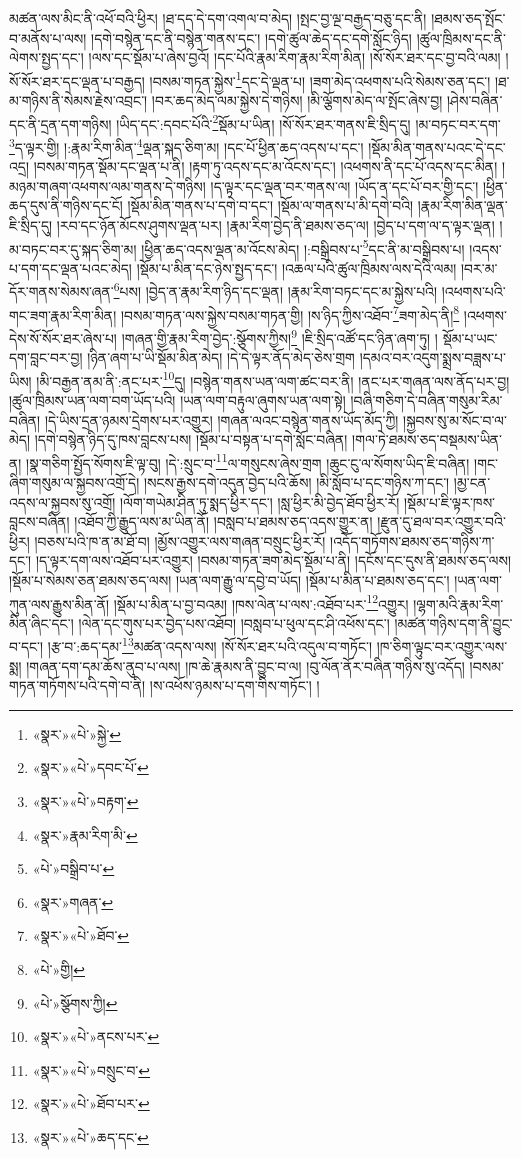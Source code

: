 མཚན་ལས་མིང་ནི་འཕོ་བའི་ཕྱིར། །ཐ་དད་དེ་དག་འགལ་བ་མེད། །སྤང་བྱ་ལྔ་བརྒྱད་བཅུ་དང་ནི། །ཐམས་ཅད་སྤོང་བ་མནོས་པ་ལས། །དགེ་བསྙེན་དང་ནི་བསྙེན་གནས་དང་། །དགེ་ཚུལ་ཆེད་དང་དགེ་སློང་ཉིད། །ཚུལ་ཁྲིམས་དང་ནི་ལེགས་སྤྱད་དང་། །ལས་དང་སྡོམ་པ་ཞེས་བྱའོ། །དང་པོའི་རྣམ་རིག་རྣམ་རིག་མིན། །སོ་སོར་ཐར་དང་བྱ་བའི་ལམ། །སོ་སོར་ཐར་དང་ལྡན་པ་བརྒྱད། །བསམ་གཏན་སྐྱེས་\footnote{«སྣར་»«པེ་»སྐྱེ་}དང་དེ་ལྡན་པ། །ཟག་མེད་འཕགས་པའི་སེམས་ཅན་དང་། །ཐ་མ་གཉིས་ནི་སེམས་རྗེས་འབྲང་། །བར་ཆད་མེད་ལམ་སྐྱེས་དེ་གཉིས། །མི་ལྕོགས་མེད་ལ་སྤོང་ཞེས་བྱ། །ཤེས་བཞིན་དང་ནི་དྲན་དག་གཉིས། །ཡིད་དང་:དབང་པོའི་\footnote{«སྣར་»«པེ་»དབང་པོ་}སྡོམ་པ་ཡིན། །སོ་སོར་ཐར་གནས་ཇི་སྲིད་དུ། །མ་བཏང་བར་དག་\footnote{«སྣར་»«པེ་»བརྟག་}ད་ལྟར་གྱི། །:རྣམ་རིག་མིན་\footnote{«སྣར་»རྣམ་རིག་མི་}ལྡན་སྐད་ཅིག་མ། །དང་པོ་ཕྱིན་ཆད་འདས་པ་དང་། །སྡོམ་མིན་གནས་པའང་དེ་དང་འདྲ། །བསམ་གཏན་སྡོམ་དང་ལྡན་པ་ནི། །རྟག་ཏུ་འདས་དང་མ་འོངས་དང་། །འཕགས་ནི་དང་པོ་འདས་དང་མིན། །མཉམ་གཞག་འཕགས་ལམ་གནས་དེ་གཉིས། །ད་ལྟར་དང་ལྡན་བར་གནས་ལ། །ཡོད་ན་དང་པོ་བར་གྱི་དང་། །ཕྱིན་ཆད་དུས་ནི་གཉིས་དང་ངོ། །སྡོམ་མིན་གནས་པ་དགེ་བ་དང་། །སྡོམ་ལ་གནས་པ་མི་དགེ་བའི། །རྣམ་རིག་མིན་ལྡན་ཇི་སྲིད་དུ། །རབ་དང་ཉོན་མོངས་ཤུགས་ལྡན་པར། །རྣམ་རིག་བྱེད་ནི་ཐམས་ཅད་ལ། །བྱེད་པ་དག་ལ་ད་ལྟར་ལྡན། །མ་བཏང་བར་དུ་སྐད་ཅིག་མ། །ཕྱིན་ཆད་འདས་ལྡན་མ་འོངས་མེད། །:བསྒྲིབས་པ་\footnote{«པེ་»བསྒྲིབ་པ་}དང་ནི་མ་བསྒྲིབས་པ། །འདས་པ་དག་དང་ལྡན་པའང་མེད། །སྡོམ་པ་མིན་དང་ཉེས་སྤྱད་དང་། །འཆལ་པའི་ཚུལ་ཁྲིམས་ལས་དེའི་ལམ། །བར་མ་དོར་གནས་སེམས་ཞན་\footnote{«སྣར་»གཞན་}པས། །བྱེད་ན་རྣམ་རིག་ཉིད་དང་ལྡན། །རྣམ་རིག་བཏང་དང་མ་སྐྱེས་པའི། །འཕགས་པའི་གང་ཟག་རྣམ་རིག་མིན། །བསམ་གཏན་ལས་སྐྱེས་བསམ་གཏན་གྱི། །ས་ཉིད་ཀྱིས་འཐོབ་\footnote{«སྣར་»«པེ་»ཐོབ་}ཟག་མེད་ནི།\footnote{«པེ་»གྱི།} །འཕགས་དེས་སོ་སོར་ཐར་ཞེས་པ། །གཞན་གྱི་རྣམ་རིག་བྱེད་:སྩོགས་ཀྱིས།\footnote{«པེ་»སྩོགས་ཀྱི།} །ཇི་སྲིད་འཚོ་དང་ཉིན་ཞག་ཏུ། །
སྡོམ་པ་ཡང་དག་བླང་བར་བྱ། །ཉིན་ཞག་པ་ཡི་སྡོམ་མིན་མེད། །དེ་དེ་ལྟར་ནོད་མེད་ཅེས་གྲག །དམའ་བར་འདུག་སྨྲས་བཟླས་པ་ཡིས། །མི་བརྒྱན་ནམ་ནི་:ནང་པར་\footnote{«སྣར་»«པེ་»ནངས་པར་}དུ། །བསྙེན་གནས་ཡན་ལག་ཚང་བར་ནི། །ནང་པར་གཞན་ལས་ནོད་པར་བྱ། །ཚུལ་ཁྲིམས་ཡན་ལག་བག་ཡོད་པའི། །ཡན་ལག་བརྟུལ་ཞུགས་ཡན་ལག་སྟེ། །བཞི་གཅིག་དེ་བཞིན་གསུམ་རིམ་བཞིན། །དེ་ཡིས་དྲན་ཉམས་དྲེགས་པར་འགྱུར། །གཞན་ལའང་བསྙེན་གནས་ཡོད་མོད་ཀྱི། །སྐྱབས་སུ་མ་སོང་བ་ལ་མེད། །དགེ་བསྙེན་ཉིད་དུ་ཁས་བླངས་པས། །སྡོམ་པ་བསྟན་པ་དགེ་སློང་བཞིན། །གལ་ཏེ་ཐམས་ཅད་བསྡམས་ཡིན་ན། །སྣ་གཅིག་སྤྱོད་སོགས་ཇི་ལྟ་བུ། །དེ་:སྲུང་བ་\footnote{«སྣར་»«པེ་»བསྲུང་བ་}ལ་གསུངས་ཞེས་གྲག །ཆུང་ངུ་ལ་སོགས་ཡིད་ཇི་བཞིན། །གང་ཞིག་གསུམ་ལ་སྐྱབས་འགྲོ་དེ། །སངས་རྒྱས་དགེ་འདུན་བྱེད་པའི་ཆོས། །མི་སློབ་པ་དང་གཉིས་ཀ་དང་། །མྱ་ངན་འདས་ལ་སྐྱབས་སུ་འགྲོ། །ལོག་གཡེམ་ཤིན་ཏུ་སྨད་ཕྱིར་དང་། །སླ་ཕྱིར་མི་བྱེད་ཐོབ་ཕྱིར་རོ། །སྡོམ་པ་ཇི་ལྟར་ཁས་བླངས་བཞིན། །འཐོབ་ཀྱི་རྒྱུད་ལས་མ་ཡིན་ནོ། །བསླབ་པ་ཐམས་ཅད་འདས་གྱུར་ན། །རྫུན་དུ་ཐལ་བར་འགྱུར་བའི་ཕྱིར། །བཅས་པའི་ཁ་ན་མ་ཐོ་བ། །མྱོས་འགྱུར་ལས་གཞན་བསྲུང་ཕྱིར་རོ། །འདོད་གཏོགས་ཐམས་ཅད་གཉིས་ཀ་དང་། །ད་ལྟར་དག་ལས་འཐོབ་པར་འགྱུར། །བསམ་གཏན་ཟག་མེད་སྡོམ་པ་ནི། །དངོས་དང་དུས་ནི་ཐམས་ཅད་ལས། །སྡོམ་པ་སེམས་ཅན་ཐམས་ཅད་ལས། །ཡན་ལག་རྒྱུ་ལ་དབྱེ་བ་ཡོད། །སྡོམ་པ་མིན་པ་ཐམས་ཅད་དང་། །ཡན་ལག་ཀུན་ལས་རྒྱུས་མིན་ནོ། །སྡོམ་པ་མིན་པ་བྱ་བའམ། །ཁས་ལེན་པ་ལས་:འཐོབ་པར་\footnote{«སྣར་»«པེ་»ཐོབ་པར་}འགྱུར། །ལྷག་མའི་རྣམ་རིག་མིན་ཞིང་དང་། །ལེན་དང་གུས་པར་བྱེད་པས་འཐོབ། །བསླབ་པ་ཕུལ་དང་ཤི་འཕོས་དང་། །མཚན་གཉིས་དག་ནི་བྱུང་བ་དང་། །རྩ་བ་:ཆད་དམ་\footnote{«སྣར་»«པེ་»ཆད་དང་}མཚན་འདས་ལས། །སོ་སོར་ཐར་པའི་འདུལ་བ་གཏོང་། །ཁ་ཅིག་ལྟུང་བར་འགྱུར་ལས་སྨ། །གཞན་དག་དམ་ཆོས་ནུབ་པ་ལས། །ཁ་ཆེ་རྣམས་ནི་བྱུང་བ་ལ། །བུ་ལོན་ནོར་བཞིན་གཉིས་སུ་འདོད། །བསམ་གཏན་གཏོགས་པའི་དགེ་བ་ནི། །ས་འཕོས་ཉམས་པ་དག་གིས་གཏོང་། །
